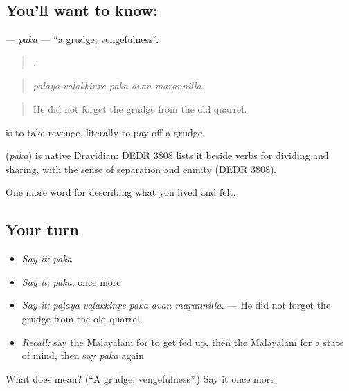 \subsection*{You'll want to know: }
\textbf{} — \emph{paka} — \textquotedblleft{}a grudge; vengefulness\textquotedblright{}.

\begin{quote}
    .
\end{quote}

\begin{quote}
\emph{paḻaya vaḻakkinṟe paka avan maṟannilla.}
\end{quote}

\begin{quote}
He did not forget the grudge from the old quarrel.
\end{quote}

  is to take revenge, literally to pay off a grudge.

\begin{cousinweb}
\textbf{} (\emph{paka}) is native Dravidian: DEDR 3808 lists it beside verbs for dividing and sharing, with the sense of separation and enmity (DEDR 3808).
\end{cousinweb}

\begin{grammarlens}[title={What you've built}]
One more word for describing what you lived and felt.
\end{grammarlens}

\subsection*{Your turn}
\begin{itemize}
\raggedright
  \item \emph{Say it:} \emph{paka}
  \item \emph{Say it:} \emph{paka}, once more
  \item \emph{Say it:} \emph{paḻaya vaḻakkinṟe paka avan maṟannilla.} — He did not forget the grudge from the old quarrel.
  \item \emph{Recall:} say the Malayalam for to get fed up, then the Malayalam for a state of mind, then say \emph{paka} again
\end{itemize}

\begin{tcolorbox}[breakable,colback=teal!4,colframe=teal!35!black,title={Before you move on}]
What does  mean? (\textquotedblleft{}A grudge; vengefulness\textquotedblright{}.) Say it once more.
\end{tcolorbox}
